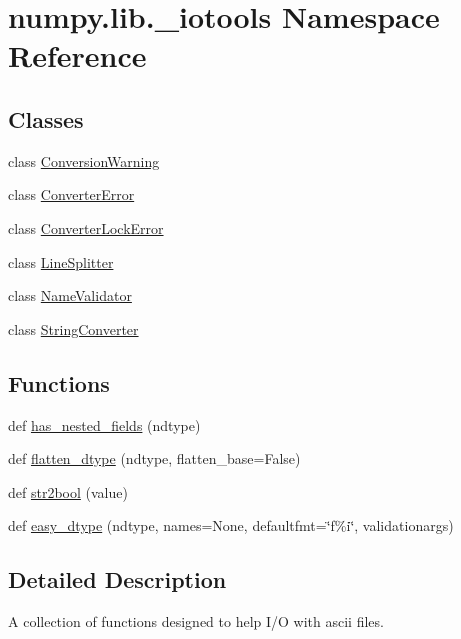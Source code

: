 \hypertarget{namespacenumpy_1_1lib_1_1__iotools}{}\section{numpy.\+lib.\+\_\+iotools Namespace Reference}
\label{namespacenumpy_1_1lib_1_1__iotools}
\subsection*{Classes}
\begin{DoxyCompactItemize}
\item 
class \hyperlink{classnumpy_1_1lib_1_1__iotools_1_1ConversionWarning}{Conversion\+Warning}
\item 
class \hyperlink{classnumpy_1_1lib_1_1__iotools_1_1ConverterError}{Converter\+Error}
\item 
class \hyperlink{classnumpy_1_1lib_1_1__iotools_1_1ConverterLockError}{Converter\+Lock\+Error}
\item 
class \hyperlink{classnumpy_1_1lib_1_1__iotools_1_1LineSplitter}{Line\+Splitter}
\item 
class \hyperlink{classnumpy_1_1lib_1_1__iotools_1_1NameValidator}{Name\+Validator}
\item 
class \hyperlink{classnumpy_1_1lib_1_1__iotools_1_1StringConverter}{String\+Converter}
\end{DoxyCompactItemize}
\subsection*{Functions}
\begin{DoxyCompactItemize}
\item 
def \hyperlink{namespacenumpy_1_1lib_1_1__iotools_a963397b6c785faf85aa430b490365798}{has\+\_\+nested\+\_\+fields} (ndtype)
\item 
def \hyperlink{namespacenumpy_1_1lib_1_1__iotools_ae64e910fdeae338f1f962ff03efb841e}{flatten\+\_\+dtype} (ndtype, flatten\+\_\+base=False)
\item 
def \hyperlink{namespacenumpy_1_1lib_1_1__iotools_a4ecb79a687b0f134273b11e96703f23f}{str2bool} (value)
\item 
def \hyperlink{namespacenumpy_1_1lib_1_1__iotools_ac490a3a791ed204e47c9c50f704ac40e}{easy\+\_\+dtype} (ndtype, names=None, defaultfmt=\char`\"{}f\%i\char`\"{}, validationargs)
\end{DoxyCompactItemize}


\subsection{Detailed Description}
\begin{DoxyVerb}A collection of functions designed to help I/O with ascii files.\end{DoxyVerb}
 

